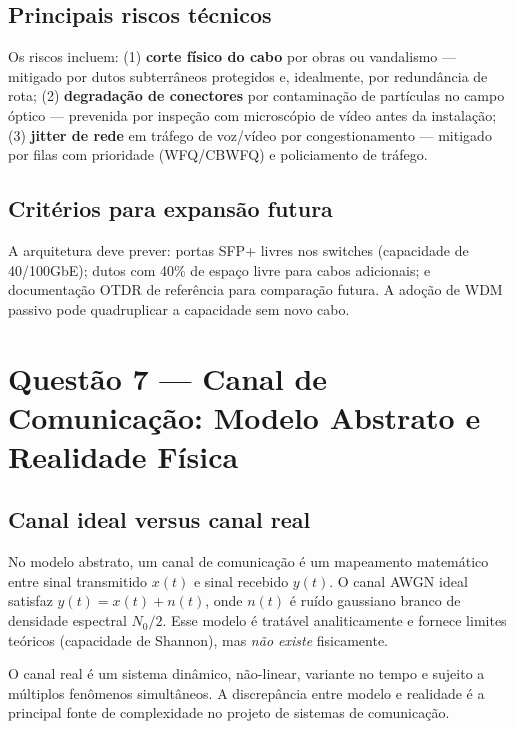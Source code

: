 \documentclass[conference]{IEEEtran}
\begin{document}
\subsection*{Principais riscos técnicos}

Os riscos incluem: (1) \textbf{corte físico do cabo} por obras ou vandalismo --- mitigado
por dutos subterrâneos protegidos e, idealmente, por redundância de rota; (2)
\textbf{degradação de conectores} por contaminação de partículas no campo óptico ---
prevenida por inspeção com microscópio de vídeo antes da instalação; (3)
\textbf{jitter de rede} em tráfego de voz/vídeo por congestionamento --- mitigado por
filas com prioridade (WFQ/CBWFQ) e policiamento de tráfego.

\subsection*{Critérios para expansão futura}

A arquitetura deve prever: portas SFP+ livres nos switches (capacidade de 40/100GbE);
dutos com 40\% de espaço livre para cabos adicionais; e documentação OTDR de referência
para comparação futura. A adoção de WDM passivo pode quadruplicar a capacidade sem novo
cabo.

\section*{Questão 7 — Canal de Comunicação: Modelo Abstrato e Realidade Física}

\subsection*{Canal ideal versus canal real}

No modelo abstrato, um canal de comunicação é um mapeamento matemático entre sinal
transmitido $x(t)$ e sinal recebido $y(t)$. O canal AWGN ideal satisfaz $y(t) = x(t) + n(t)$,
onde $n(t)$ é ruído gaussiano branco de densidade espectral $N_0/2$. Esse modelo é
tratável analiticamente e fornece limites teóricos (capacidade de Shannon), mas \textit{não
existe} fisicamente.

O canal real é um sistema dinâmico, não-linear, variante no tempo e sujeito a múltiplos
fenômenos simultâneos. A discrepância entre modelo e realidade é a principal fonte de
complexidade no projeto de sistemas de comunicação.
\end{document}
